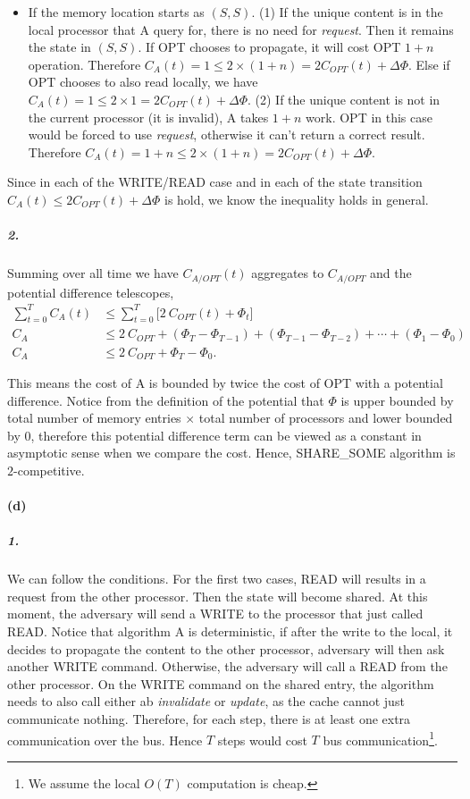 \documentclass[12pt]{article}
\begin{document}
\begin{itemize}
	\item If the memory location starts as $(S, S)$. (1) If the unique content is in the local processor that A query for, there is no need for \emph{request}. Then it remains the state in $(S, S)$. If OPT chooses to propagate, it will cost OPT $1+n$ operation. Therefore $C_A(t) = 1 \leq 2\times (1 + n) = 2C_{OPT}(t) + \Delta \Phi$. Else if OPT chooses to also read locally, we have $C_A(t) = 1 \leq 2\times 1 = 2C_{OPT}(t) + \Delta \Phi$. (2) If the unique content is not in the current processor (it is invalid), A takes $1+n$ work. OPT in this case would be forced to use \emph{request}, otherwise it can't return a correct result. Therefore $C_A(t) = 1 + n \leq 2\times (1 + n) = 2C_{OPT}(t) + \Delta \Phi$.
\end{itemize} 

Since in each of the WRITE/READ case and in each of the state transition $C_A(t) \leq 2C_{OPT}(t) + \Delta \Phi$ is hold, we know the inequality holds in general. 

\subparagraph{2. } Summing over all time we have $C_{A/OPT}(t)$ aggregates to $C_{A/OPT}$ and the potential difference telescopes, 
\begin{align*}
\sum_{t=0}^T C_A(t) &\leq \sum_{t=0}^{T} \Big[2\:C_{OPT}(t) + \Phi_t\Big]\\
C_A &\leq 2\:C_{OPT} + (\Phi_T - \Phi_{T-1}) + (\Phi_{T-1} - \Phi_{T-2}) + \cdots +  (\Phi_{1} - \Phi_{0})\\
C_A &\leq 2\:C_{OPT} + \Phi_T - \Phi_0.
\end{align*}

This means the cost of A is bounded by twice the cost of OPT with a potential difference. Notice from the definition of the potential that $\Phi$ is upper bounded by total number of memory entries $\times$ total number of processors and lower bounded by 0, therefore this potential difference term can be viewed as a constant in asymptotic sense when we compare the cost. Hence, SHARE\_SOME algorithm is $2$-competitive. 

\paragraph{(d)} 
\subparagraph{1. } We can follow the conditions. For the first two cases, READ will results in a request from the other processor. Then the state will become shared. At this moment, the adversary will send a WRITE to the processor that just called READ. Notice that algorithm A is deterministic, if after the write to the local, it decides to propagate the content to the other processor, adversary will then ask another WRITE command. Otherwise, the adversary will call a READ from the other processor. On the WRITE command on the shared entry, the algorithm needs to also call either ab \emph{invalidate} or \emph{update}, as the cache cannot just communicate nothing. Therefore, for each step, there is at least one extra communication over the bus. Hence $T$ steps would cost $T$ bus communication\footnote{We assume the local $O(T)$ computation is cheap.}.
\end{document}
